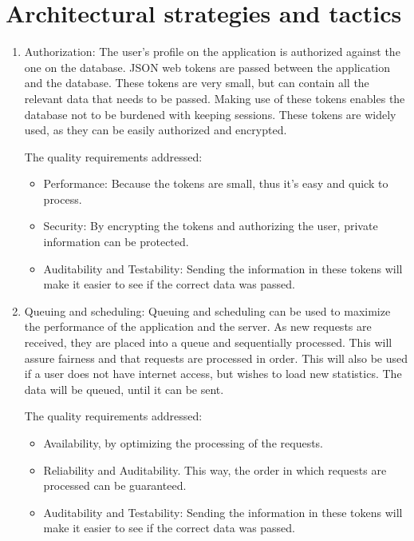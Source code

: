 \documentclass[hidelinks,a4paper,12pt]{article}
\begin{document}
\section{Architectural strategies and tactics}
	\begin{enumerate}
	
		\item Authorization:
		The user's profile on the application is authorized against the one on the database. JSON web tokens are passed between the application and the database. These tokens are very small, but can contain all the relevant data that needs to be passed. Making use of these tokens enables the database not to be burdened with keeping sessions. These tokens are widely used, as they can be easily authorized and encrypted.

		The quality requirements addressed:
		\begin{itemize}
			\item Performance: Because the tokens are small, thus it's easy and quick to process.
			\item Security: By encrypting the tokens and authorizing the user, private information can be protected.
			\item Auditability and Testability: Sending the information in these tokens will make it easier to see if the correct data was passed.
		\end{itemize}
		
		\item Queuing and scheduling:
		Queuing and scheduling can be used to maximize the performance of the application and the server. As new requests are received, they are placed into a queue and sequentially processed. This will assure fairness and that requests are processed in order. This will also be used if a user does not have internet access, but wishes to load new statistics. The data will be queued, until it can be sent.

		The quality requirements addressed:
		\begin{itemize}
			\item Availability, by optimizing the processing of the requests.
			\item Reliability and Auditability. This way, the order in which requests are processed can be guaranteed.
			\item Auditability and Testability: Sending the information in these tokens will make it easier to see if the correct data was passed.
		\end{itemize}
		

\end{enumerate}
\end{document}

